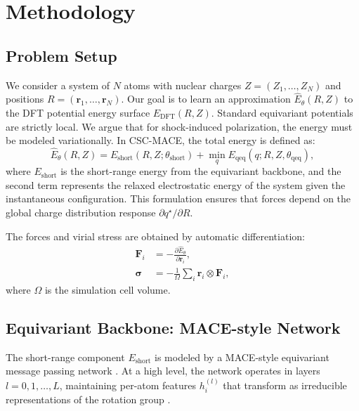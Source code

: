 \documentclass{article}
\begin{document}
\section{Methodology}
\label{sec:method}

\subsection{Problem Setup}

We consider a system of $N$ atoms with nuclear charges $Z = (Z_1, \dots, Z_N)$ and positions $R = (\mathbf{r}_1, \dots, \mathbf{r}_N)$. Our goal is to learn an approximation $\hat{E}_\theta(R, Z)$ to the DFT potential energy surface $E_{\text{DFT}}(R, Z)$. Standard equivariant potentials are strictly local. We argue that for shock-induced polarization, the energy must be modeled variationally. In CSC-MACE, the total energy is defined as:
\begin{equation}
    \hat{E}_\theta(R, Z) = E_{\text{short}}(R, Z; \theta_{\text{short}}) + \min_{q} E_{\text{qeq}}(q; R, Z, \theta_{\text{qeq}}),
    \label{eq:total_energy}
\end{equation}
where $E_{\text{short}}$ is the short-range energy from the equivariant backbone, and the second term represents the relaxed electrostatic energy of the system given the instantaneous configuration. This formulation ensures that forces depend on the global charge distribution response $\partial q^\star / \partial R$.

The forces and virial stress are obtained by automatic differentiation:
\begin{align}
    \mathbf{F}_i &= -\frac{\partial \hat{E}_\theta}{\partial \mathbf{r}_i}, \\
    \boldsymbol{\sigma} &= -\frac{1}{\Omega} \sum_{i} \mathbf{r}_i \otimes \mathbf{F}_i,
\end{align}
where $\Omega$ is the simulation cell volume.

\subsection{Equivariant Backbone: MACE-style Network}

The short-range component $E_{\text{short}}$ is modeled by a MACE-style equivariant message passing network \cite{batatia2022mace}. At a high level, the network operates in layers $l = 0, 1, \dots, L$, maintaining per-atom features $h_i^{(l)}$ that transform as irreducible representations of the rotation group \cite{nigam2022unified}.
\end{document}
